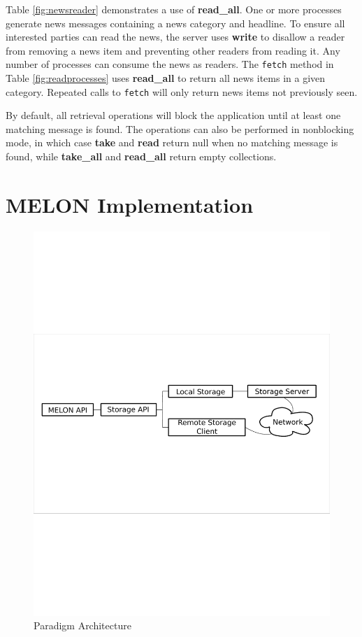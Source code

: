 \documentclass[lnicst]{svmultln}
\begin{document}
Table \ref{fig:newsreader} demonstrates a use of \textbf{read\_all}. One or more processes generate news messages containing a news category and headline. To ensure all interested parties can read the news, the server uses \textbf{write} to disallow a reader from removing a news item and preventing other readers from reading it. Any number of processes can consume the news as readers. The \texttt{fetch} method in Table \ref{fig:readprocesses} uses \textbf{read\_all} to return all news items in a given category. Repeated calls to \texttt{fetch} will only return news items not previously seen.

By default, all retrieval operations will block the application until at least one matching message is found. The operations can also be performed in nonblocking mode, in which case \textbf{take} and \textbf{read} return null when no matching message is found, while \textbf{take\_all} and \textbf{read\_all} return empty collections.
   
\section{MELON Implementation}\label{sec:implementation}

\begin{figure}
\centering
\includegraphics[scale = .50, clip, trim = 10px 350px 10px 312px]{figures/paradigm_arch.pdf}
\caption{Paradigm Architecture}
\label{fig:architecture}
\end{figure}
\end{document}

